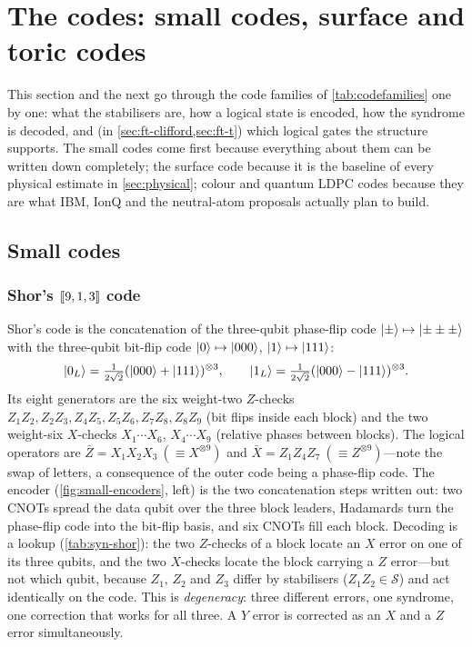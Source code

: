 \section{The codes: small codes, surface and toric codes}\label{sec:codes}

This section and the next go through the code families of \cref{tab:codefamilies} one by one: what the stabilisers are, how a logical state is encoded, how the syndrome is decoded, and (in \cref{sec:ft-clifford,sec:ft-t}) which logical gates the structure supports. The small codes come first because everything about them can be written down completely; the surface code because it is the baseline of every physical estimate in \cref{sec:physical}; colour and quantum LDPC codes because they are what IBM, IonQ and the neutral-atom proposals actually plan to build.

\subsection{Small codes}\label{sec:smallcodes}

\subsubsection{Shor's $[\![9,1,3]\!]$ code}
Shor's code \cite{shor95} is the concatenation of the three-qubit phase-flip code $\lvert \pm \rangle\mapsto\lvert \pm\pm\pm \rangle$ with the three-qubit bit-flip code $\lvert 0 \rangle\mapsto\lvert 000 \rangle$, $\lvert 1 \rangle\mapsto\lvert 111 \rangle$:
\[
\lvert 0_L \rangle=\tfrac1{2\sqrt2}(\lvert 000 \rangle+\lvert 111 \rangle)^{\otimes3},\qquad
\lvert 1_L \rangle=\tfrac1{2\sqrt2}(\lvert 000 \rangle-\lvert 111 \rangle)^{\otimes3}.
\]
Its eight generators are the six weight-two $Z$-checks $Z_1Z_2,Z_2Z_3,Z_4Z_5,Z_5Z_6,Z_7Z_8,Z_8Z_9$ (bit flips inside each block) and the two weight-six $X$-checks $X_1\cdots X_6$, $X_4\cdots X_9$ (relative phases between blocks). The logical operators are $\bar Z=X_1X_2X_3\ (\equiv X^{\otimes9})$ and $\bar X=Z_1Z_4Z_7\ (\equiv Z^{\otimes9})$---note the swap of letters, a consequence of the outer code being a phase-flip code. The encoder (\cref{fig:small-encoders}, left) is the two concatenation steps written out: two CNOTs spread the data qubit over the three block leaders, Hadamards turn the phase-flip code into the bit-flip basis, and six CNOTs fill each block. Decoding is a lookup (\cref{tab:syn-shor}): the two $Z$-checks of a block locate an $X$ error on one of its three qubits, and the two $X$-checks locate the block carrying a $Z$ error---but not which qubit, because $Z_1$, $Z_2$ and $Z_3$ differ by stabilisers ($Z_1Z_2\in\mathcal S$) and act identically on the code. This is \emph{degeneracy}: three different errors, one syndrome, one correction that works for all three. A $Y$ error is corrected as an $X$ and a $Z$ error simultaneously.

